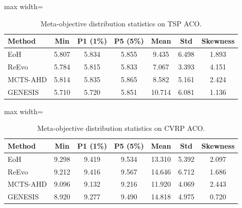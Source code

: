 \documentclass[sigconf,anonymous]{aamas}
\begin{document}
\begin{table}[!htbp]
\centering
\scriptsize
\setlength{\tabcolsep}{3pt}

\caption{Meta-objective distribution statistics on TSP ACO.}
\label{tab:tsp_aco_distribution}
\begin{adjustbox}{max width=\columnwidth}
\begin{tabular}{@{}lcccccc@{}}
\toprule
Method & Min & P1 (1\%) & P5 (5\%) & Mean & Std & Skewness \\
\midrule
EoH        & 5.807 & 5.834 & 5.855 & 9.435 & 6.498 & 1.893 \\
ReEvo      & 5.784 & 5.815 & 5.833 & 7.067 & 3.393 & 4.151 \\
MCTS-AHD   & 5.814 & 5.835 & 5.865 & 8.582 & 5.161 & 2.424 \\
GENESIS    & 5.710 & 5.720 & 5.851 & 10.714 & 6.081 & 1.136 \\
\bottomrule
\end{tabular}
\end{adjustbox}
\end{table}


\begin{table}[!htbp]
\centering
\scriptsize
\setlength{\tabcolsep}{3pt}

\caption{Meta-objective distribution statistics on CVRP ACO.}
\label{tab:cvrp_aco_distribution}
\begin{adjustbox}{max width=\columnwidth}
\begin{tabular}{@{}lcccccc@{}}
\toprule
Method & Min & P1 (1\%) & P5 (5\%) & Mean & Std & Skewness \\
\midrule
EoH        & 9.298 & 9.419 & 9.534 & 13.310 & 5.392 & 2.097 \\
ReEvo      & 9.212 & 9.416 & 9.567 & 14.646 & 6.712 & 1.686 \\
MCTS-AHD   & 9.096 & 9.132 & 9.216 & 11.920 & 4.069 & 2.443 \\
GENESIS    & 8.920 & 9.277 & 9.490 & 14.818 & 4.975 & 0.720 \\
\bottomrule
\end{tabular}
\end{adjustbox}
\end{table}
\end{document}
